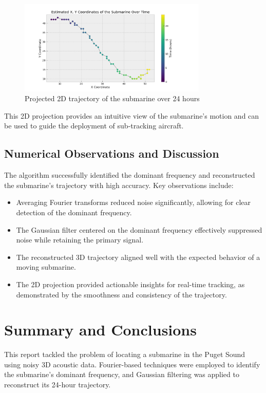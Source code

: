 \documentclass[11pt]{amsart}
\begin{document}
\begin{figure}[htp]
\centering
\includegraphics[width=0.8\textwidth]{trajectory_xy.png}
\caption{Projected 2D trajectory of the submarine over 24 hours}
\label{fig:trajectory-2d}
\end{figure}

This 2D projection provides an intuitive view of the submarine's motion and can be used to guide the deployment of sub-tracking aircraft.

\subsection{Numerical Observations and Discussion}

The algorithm successfully identified the dominant frequency and reconstructed the submarine's trajectory with high accuracy. Key observations include:
\begin{itemize}
    \item Averaging Fourier transforms reduced noise significantly, allowing for clear detection of the dominant frequency.
    \item The Gaussian filter centered on the dominant frequency effectively suppressed noise while retaining the primary signal.
    \item The reconstructed 3D trajectory aligned well with the expected behavior of a moving submarine.
    \item The 2D projection provided actionable insights for real-time tracking, as demonstrated by the smoothness and consistency of the trajectory.
\end{itemize}


\section{Summary and Conclusions}\label{sec:conclusions}

This report tackled the problem of locating a submarine in the Puget Sound using noisy 3D acoustic data. Fourier-based techniques were employed to identify the submarine's dominant frequency, and Gaussian filtering was applied to reconstruct its 24-hour trajectory.
\end{document}
